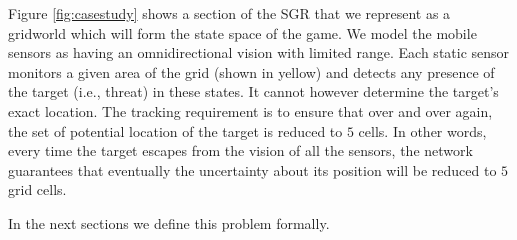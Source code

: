 Figure \ref{fig:casestudy} shows a section of the SGR that we represent as a gridworld which will form the state space of the game. We model the mobile sensors as having an omnidirectional vision with limited range. Each static sensor monitors a given area of the grid (shown in yellow) and detects any presence of the target (i.e., threat) in these states. It cannot however determine the target's exact location. The tracking requirement is to ensure that over and over again, the set of potential location of the target is reduced to $5$ cells. In other words, every time the target escapes from the vision of all the sensors, the network guarantees that eventually the uncertainty about its position will be reduced to $5$ grid cells.

In the next sections we  define this problem formally.
